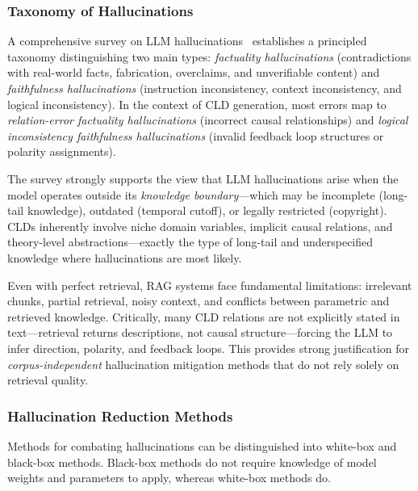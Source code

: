\subsubsection{Taxonomy of Hallucinations}

A comprehensive survey on LLM hallucinations~\citep{huang2025hallucination} establishes a principled taxonomy distinguishing two main types: \textit{factuality hallucinations} (contradictions with real-world facts, fabrication, overclaims, and unverifiable content) and \textit{faithfulness hallucinations} (instruction inconsistency, context inconsistency, and logical inconsistency). In the context of CLD generation, most errors map to \textit{relation-error factuality hallucinations} (incorrect causal relationships) and \textit{logical inconsistency faithfulness hallucinations} (invalid feedback loop structures or polarity assignments).

The survey strongly supports the view that LLM hallucinations arise when the model operates outside its \textit{knowledge boundary}---which may be incomplete (long-tail knowledge), outdated (temporal cutoff), or legally restricted (copyright). CLDs inherently involve niche domain variables, implicit causal relations, and theory-level abstractions---exactly the type of long-tail and underspecified knowledge where hallucinations are most likely.

Even with perfect retrieval, RAG systems face fundamental limitations: irrelevant chunks, partial retrieval, noisy context, and conflicts between parametric and retrieved knowledge. Critically, many CLD relations are not explicitly stated in text---retrieval returns descriptions, not causal structure---forcing the LLM to infer direction, polarity, and feedback loops. This provides strong justification for \textit{corpus-independent} hallucination mitigation methods that do not rely solely on retrieval quality.

\subsubsection{Hallucination Reduction Methods}

Methods for combating hallucinations can be distinguished into white-box and black-box methods. Black-box methods do not require knowledge of model weights and parameters to apply, whereas white-box methods do.

